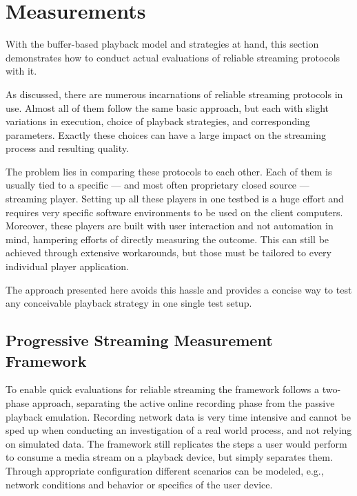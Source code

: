 \section{Measurements}
\label{c3:sec:measurements}

With the buffer-based playback model and strategies at hand, this section demonstrates how to conduct actual evaluations of reliable streaming protocols with it.

As discussed, there are numerous incarnations of reliable streaming protocols in use. Almost all of them follow the same basic approach, but each with slight variations in execution, choice of playback strategies, and corresponding parameters. Exactly these choices can have a large impact on the streaming process and resulting quality. 

The problem lies in comparing these protocols to each other. Each of them is usually tied to a specific --- and most often proprietary closed source --- streaming player. Setting up all these players in one testbed is a huge effort and requires very specific software environments to be used on the client computers. Moreover, these players are built with user interaction and not automation in mind, hampering efforts of directly measuring the outcome. This can still be achieved through extensive workarounds, but those must be tailored to every individual player application. 

The approach presented here avoids this hassle and provides a concise way to test any conceivable playback strategy in one single test setup.


\subsection{Progressive Streaming Measurement Framework}

To enable quick evaluations for reliable streaming the framework follows a two-phase approach, separating the active online recording phase from the passive playback emulation. Recording network data is very time intensive and cannot be sped up when conducting an investigation of a real world process, and not relying on simulated data. The framework still replicates the steps a user would perform to consume a media stream on a playback device, but simply separates them. Through appropriate configuration different scenarios can be modeled, e.g., network conditions and behavior or specifics of the user device.
 
